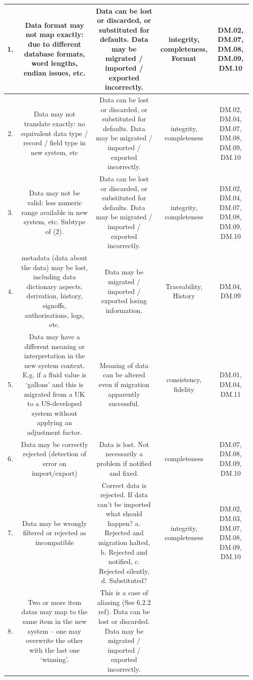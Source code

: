 \begin{longtable}{|C{}|C{}|C{}|C{}|C{}|}
1.&
Data format may not map exactly: due to different \gls{database} formats, word lengths, endian issues, etc.&
Data can be lost or discarded, or substituted for defaults. Data may be migrated / imported / exported incorrectly.&
\Gls{integrity}, \gls{completeness}, Format&
DM.02, DM.07, DM.08, DM.09, DM.10\\\hline
%
2.&
Data may not translate exactly: no equivalent data type / record / field type in new system, etc&
Data can be lost or discarded, or substituted for defaults. Data may be migrated / imported / exported incorrectly.&
\Gls{integrity}, \gls{completeness}&
DM.02, DM.04, DM.07, DM.08, DM.09, DM.10\\\hline
%
3.&
Data may not be valid: less numeric range available in new system, etc. Subtype of (2).&
Data can be lost or discarded, or substituted for defaults. Data may be migrated / imported / exported incorrectly.&
\Gls{integrity}, \gls{completeness}&
DM.02, DM.04, DM.07, DM.08, DM.09, DM.10\\\hline
%
4.&
\Gls{metadata} (data about the data) may be lost, including \gls{data dictionary} aspects, derivation, history, signoffs, authorisations,
logs, etc.&
Data may be migrated / imported / exported losing \gls{information}.&
Traceability, History&
DM.04, DM.09\\\hline
%
5.&
Data may have a different meaning or interpretation in the new system context.
E.g. if a fluid value is ‘gallons’ and this is migrated from a UK to a US-developed system without applying an adjustment factor.&
Meaning of data can be altered even if migration apparently successful.&
\Gls{consistency}, \gls{fidelity}&
DM.01, DM.04, DM.11\\\hline
%
6.
&
Data may be correctly rejected (detection of error on import/export)&
Data is lost. Not necessarily a problem if notified and fixed.&
\Gls{completeness}&
DM.07, DM.08, DM.09, DM.10\\\hline
%
7.
&
Data may be wrongly filtered or rejected as incompatible&
Correct data is rejected. If data can’t be imported what should happen? a. Rejected and migration halted,
b. Rejected and notified, c. Rejected silently, d. Substituted?&
\Gls{integrity}, \gls{completeness}&
DM.02, DM.03, DM.07, DM.08, DM.09, DM.10\\\hline
%
8.&
Two or more \glspl{item data} may map to the same item in the new system – one may overwrite the other with the last one ‘winning’.&
This is a case of aliasing (See 6.2.2 ref). Data can be lost or discarded. Data may be migrated / imported / exported incorrectly.&

\end{longtable}
